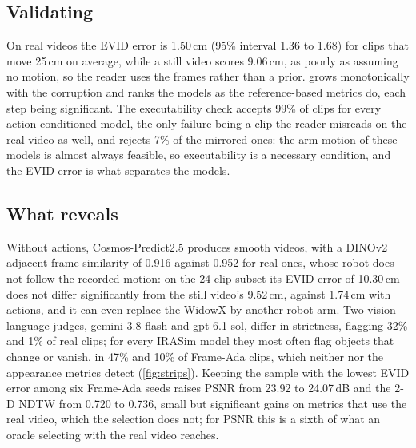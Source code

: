 \subsection{Validating \ours{}}
On real videos the EVID error is 1.50\,cm (95\% interval 1.36 to 1.68) for clips that move 25\,cm on average, while a still video scores 9.06\,cm, as poorly as assuming no motion, so the reader uses the frames rather than a prior.
\ours{} grows monotonically with the corruption and ranks the models as the reference-based metrics do, each step being significant.
The executability check accepts 99\% of clips for every action-conditioned model, the only failure being a clip the reader misreads on the real video as well, and rejects 7\% of the mirrored ones: the arm motion of these models is almost always feasible, so executability is a necessary condition, and the EVID error is what separates the models.

\subsection{What \ours{} reveals}
Without actions, Cosmos-Predict2.5 produces smooth videos, with a DINOv2 adjacent-frame similarity of 0.916 against 0.952 for real ones, whose robot does not follow the recorded motion: on the 24-clip subset its EVID error of 10.30\,cm does not differ significantly from the still video's 9.52\,cm, against 1.74\,cm with actions, and it can even replace the WidowX by another robot arm.
Two vision-language judges, gemini-3.8-flash and gpt-6.1-sol, differ in strictness, flagging 32\% and 1\% of real clips; for every IRASim model they most often flag objects that change or vanish, in 47\% and 10\% of Frame-Ada clips, which neither \ours{} nor the appearance metrics detect (\cref{fig:strips}).
Keeping the sample with the lowest EVID error among six Frame-Ada seeds raises PSNR from 23.92 to 24.07\,dB and the 2-D NDTW from 0.720 to 0.736, small but significant gains on metrics that use the real video, which the selection does not; for PSNR this is a sixth of what an oracle selecting with the real video reaches.


